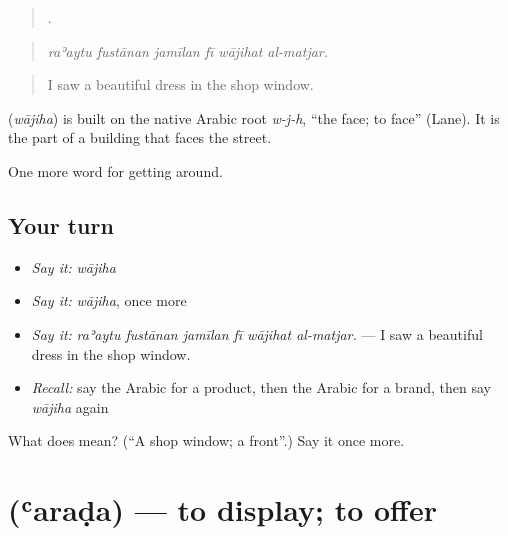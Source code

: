 \begin{quote}
     .
\end{quote}

\begin{quote}
\emph{raʾaytu fustānan jamīlan fī wājihat al-matjar.}
\end{quote}

\begin{quote}
I saw a beautiful dress in the shop window.
\end{quote}

\begin{cousinweb}
\textbf{} (\emph{wājiha}) is built on the native Arabic root \emph{w-j-h}, \textquotedblleft{}the face; to face\textquotedblright{} (Lane). It is the part of a building that faces the street.
\end{cousinweb}

\begin{grammarlens}[title={What you've built}]
One more word for getting around.
\end{grammarlens}

\subsection*{Your turn}
\begin{itemize}
\raggedright
  \item \emph{Say it:} \emph{wājiha}
  \item \emph{Say it:} \emph{wājiha}, once more
  \item \emph{Say it:} \emph{raʾaytu fustānan jamīlan fī wājihat al-matjar.} — I saw a beautiful dress in the shop window.
  \item \emph{Recall:} say the Arabic for a product, then the Arabic for a brand, then say \emph{wājiha} again
\end{itemize}

\begin{tcolorbox}[breakable,colback=teal!4,colframe=teal!35!black,title={Before you move on}]
What does  mean? (\textquotedblleft{}A shop window; a front\textquotedblright{}.) Say it once more.
\end{tcolorbox}
\section[\texorpdfstring{\ar{عرض} (ʿaraḍa)}{عرض (ʿaraḍa)}]{ (ʿaraḍa) — to display; to offer}


